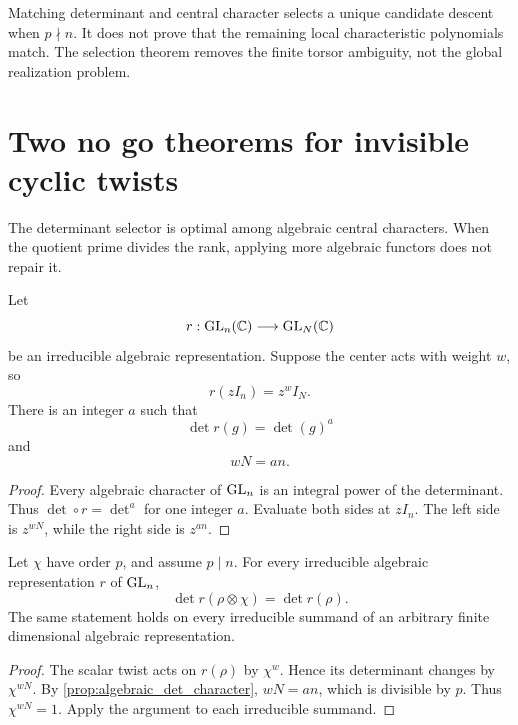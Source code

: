\begin{remark}\label{rem:determinant_not_attachment}
Matching determinant and central character selects a unique candidate descent when \(p\nmid n\). It does not prove that the remaining local characteristic polynomials match. The selection theorem removes the finite torsor ambiguity, not the global realization problem.
\end{remark}

\section{Two no go theorems for invisible cyclic twists}\label{sec:no_go}

The determinant selector is optimal among algebraic central characters. When the quotient prime divides the rank, applying more algebraic functors does not repair it.

\begin{proposition}\label{prop:algebraic_det_character}
Let
\[
 r:\operatorname{GL}_n(\mathbb C)\longrightarrow\operatorname{GL}_N(\mathbb C)
\]
be an irreducible algebraic representation. Suppose the center acts with weight \(w\), so
\[
 r(zI_n)=z^wI_N.
\]
There is an integer \(a\) such that
\[
\boxed{
 \det r(g)=\det(g)^a
}
\]
and
\[
\boxed{
 wN=an.
}
\]
\end{proposition}

\begin{proof}
Every algebraic character of \(\operatorname{GL}_n\) is an integral power of the determinant. Thus \(\det\circ r=\det^a\) for one integer \(a\). Evaluate both sides at \(zI_n\). The left side is \(z^{wN}\), while the right side is \(z^{an}\).
\end{proof}

\begin{theorem}\label{thm:central_character_no_go}
Let \(\chi\) have order \(p\), and assume \(p\mid n\). For every irreducible algebraic representation \(r\) of \(\operatorname{GL}_n\),
\[
\boxed{
 \det r(\rho\otimes\chi)=\det r(\rho).
}
\]
The same statement holds on every irreducible summand of an arbitrary finite dimensional algebraic representation.
\end{theorem}

\begin{proof}
The scalar twist acts on \(r(\rho)\) by \(\chi^w\). Hence its determinant changes by \(\chi^{wN}\). By \cref{prop:algebraic_det_character}, \(wN=an\), which is divisible by \(p\). Thus \(\chi^{wN}=1\). Apply the argument to each irreducible summand.
\end{proof}

